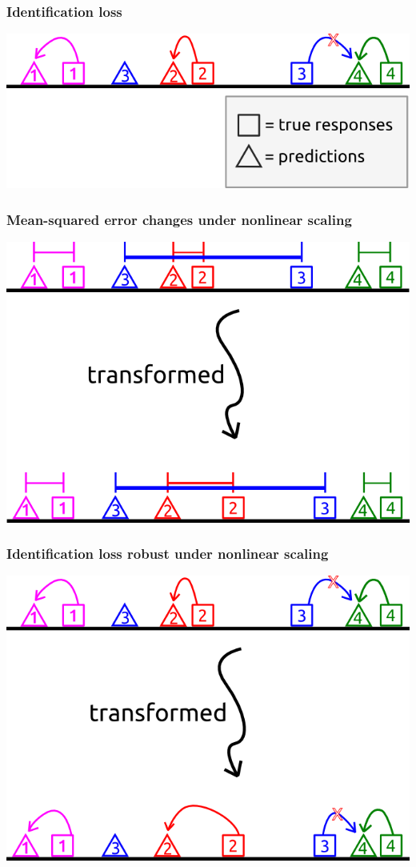 \documentclass{beamer}
\begin{document}
\begin{frame}
\frametitle{Identification loss}
\begin{center}
\includegraphics[scale = 0.5]{../diagram/idloss2b.png}
\end{center}
\end{frame}

\begin{frame}
\frametitle{Mean-squared error changes under nonlinear scaling}
\begin{center}
\includegraphics[scale = 0.5]{../diagram/idloss3a.png}
\end{center}
\end{frame}

\begin{frame}
\frametitle{Identification loss robust under nonlinear scaling}
\begin{center}
\includegraphics[scale = 0.5]{../diagram/idloss3b.png}
\end{center}
\end{frame}
\end{document}
